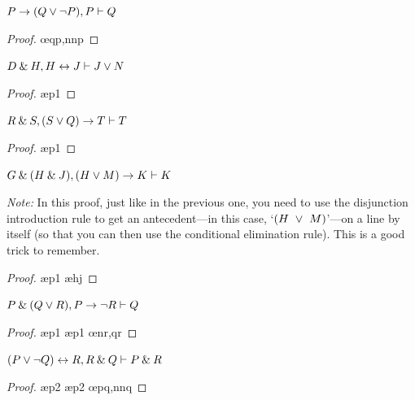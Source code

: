 \begin{small}
\begin{earg}
\item $P \rightarrow (Q \vee {\neg} P), P \vdash Q$\\
\begin{proof}
	 \pr{}
	 \pr{}
	 
	  
	 \oe{qp,nnp}
\end{proof}
\medskip


\item $D \mathbin{\&} H, H \leftrightarrow J  \vdash J \vee N$ 
\begin{proof}
	 \pr{}
	 \pr{}
	 \ae{p1}
	 
	 
\end{proof}
\medskip


\item $R \mathbin{\&} S, (S \vee Q) \rightarrow T \vdash T$
\begin{proof}
	 \pr{}
	 \pr{}
	 \ae{p1}
	 
	 
\end{proof}
\medskip

\item $G \mathbin{\&} (H \mathbin{\&} J), (H \vee M) \rightarrow K \vdash K$
\smallskip

\textit{Note:} In this proof, just like in the previous one, you need to use the disjunction introduction rule to get an antecedent---in this case, `$(H~\vee~M)$'---on a line by itself (so that you can then use the conditional elimination rule). This is a good trick to remember. 
\begin{proof}
	 \pr{}
	 \pr{}
	 \ae{p1}
	 \ae{hj}
	 
	 
\end{proof}
\medskip


\item $P \mathbin{\&} (Q \vee R), P \rightarrow {\neg} R \vdash Q$
\begin{proof}
	 \pr{}
	 \pr{}
	 \ae{p1}
	 
	 \ae{p1}
	 \oe{nr,qr}
\end{proof}
\medskip

\noindent\begin{minipage}{0.99\textwidth}
\item $(P \vee {\neg} Q) \leftrightarrow R, R \mathbin{\&} Q \vdash P \mathbin{\&} R$\smallskip
\begin{proof}
 \pr{}
 \pr{}
 \ae{p2}
 
 \ae{p2}
 
 \oe{pq,nnq}
 
\end{proof}
\medskip
\end{minipage}



\end{earg}
\end{small}
